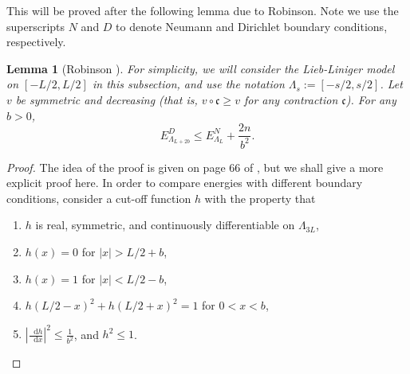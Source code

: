 \documentclass[a4paper,11pt]{article}
\newcommand{\abs}[1]{\left\lvert #1 \right\rvert}
\newcommand*\diff{\mathop{}\!\mathrm{d}}
\newtheorem{lemma}[theorem]{Lemma}
\numberwithin{equation}{section}
\begin{document}
This will be proved after the following lemma due to Robinson. Note we use the superscripts $N$ and $D$ to denote Neumann and Dirichlet boundary conditions, respectively. 
	\begin{lemma}[Robinson \cite{robinson2014thermodynamic}]\label{LemmaRobinson}
	For simplicity, we will consider the Lieb-Liniger model on $[-L/2,L/2]$ in this subsection, and use the notation $\Lambda_s:=[-s/2,s/2]$.
		Let $ v$ be symmetric and decreasing (that is, $ v\circ \mathfrak{c}\geq v $ for any contraction $ \mathfrak{c} $). For any $ b>0 $,  \begin{equation}\label{EqRobinsonBound}
		E^D_{\Lambda_{L+2b}}\leq E^N_{\Lambda_L}+\frac{2n}{b^2}.
		\end{equation}
	\end{lemma}
	\begin{proof}
		The idea of the proof is given on page 66 of \cite{robinson2014thermodynamic}, but we shall give a more explicit proof here. In order to compare energies with different boundary conditions, consider a cut-off function $ h $ with the property that
		\begin{enumerate}
		\item $ h $ is real, symmetric, and continuously differentiable on $ \Lambda_{3L} $,
		\item $ h(x)=0 $ for $ \abs{x}>L/2+b $,
		\item $ h(x)=1 $ for $ \abs{x}<L/2-b $,
		\item $ h(L/2-x)^2+h(L/2+x)^2=1 $ for $ 0<x<b $,
		\item $ \abs{\frac{\diff h}{\diff x}}^2\leq \frac{1}{b^2} $, and $ h^2\leq 1 $.
	    \end{enumerate}
		

\end{proof}
\end{document}
